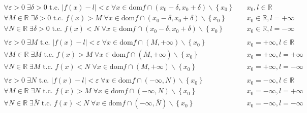 \documentclass[a4paper]{article}
\newcommand\dom{\text{dom}}
\begin{document}
\begin{align*}
		\forall \varepsilon > 0 \; \exists \delta > 0 \text{ t.c. } \left| f(x) - l \right| < \varepsilon \; \forall x \in \dom f \cap \left( x_0 - \delta, x_0 + \delta \right) \backslash \left\{ x_0 \right\} \quad & x_0, l \in \mathbb{R} \\
		\forall M \in \mathbb{R} \; \exists \delta > 0 \text{ t.c. } f(x) > M \; \forall x \in \dom f \cap \left( x_0 - \delta, x_0 + \delta \right) \backslash \left\{ x_0 \right\} \quad & x_0 \in \mathbb{R}, l = + \infty \\
		\forall N \in \mathbb{R} \; \exists \delta > 0 \text{ t.c. } f(x) < N \; \forall x \in \dom f \cap \left( x_0 - \delta, x_0 + \delta \right) \backslash \left\{ x_0 \right\} \quad & x_0 \in \mathbb{R}, l = - \infty \\
		\\
		\forall \varepsilon > 0 \; \exists M \text{ t.c. } \left| f(x) - l \right| < \varepsilon \; \forall x \in \dom f \cap \left( M, + \infty \right) \backslash \left\{ x_0 \right\} \quad & x_0 = + \infty, l \in \mathbb{R} \\
		\forall M \in \mathbb{R} \; \exists \overline{M} \text{ t.c. } f(x) > M \; \forall x \in \dom f \cap \left( \overline{M}, + \infty \right) \backslash \left\{ x_0 \right\} \quad & x_0 = + \infty, l = + \infty \\
		\forall N \in \mathbb{R} \; \exists M \text{ t.c. } f(x) < N \; \forall x \in \dom f \cap \left( M, + \infty \right) \backslash \left\{ x_0 \right\} \quad & x_0 = + \infty, l = - \infty \\
		\\
		\forall \varepsilon > 0 \; \exists N \text{ t.c. } \left| f(x) - l \right| < \varepsilon \; \forall x \in \dom f \cap \left( - \infty, N \right) \backslash \left\{ x_0 \right\} \quad & x_0 = - \infty, l \in \mathbb{R} \\
		\forall M \in \mathbb{R} \; \exists N \text{ t.c. } f(x) > M \; \forall x \in \dom f \cap \left( - \infty, N \right) \backslash \left\{ x_0 \right\} \quad & x_0 = - \infty, l = + \infty \\
		\forall N \in \mathbb{R} \; \exists \overline{N} \text{ t.c. } f(x) < N \; \forall x \in \dom f \cap \left( - \infty, \overline{N} \right) \backslash \left\{ x_0 \right\} \quad & x_0 = - \infty, l = - \infty
\end{align*}
\end{document}
